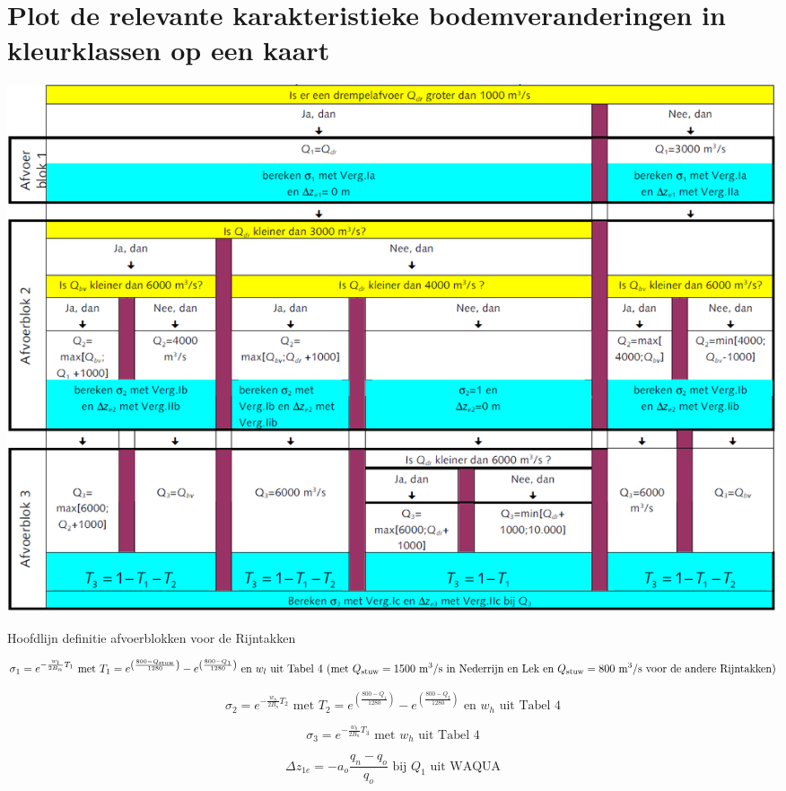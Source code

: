 \begin{enumerate}
\end{enumerate}

\section{Plot de relevante karakteristieke bodemveranderingen in kleurklassen op een kaart}

\begin{table}
\includegraphics[width=\columnwidth]{figures/Tab7.png}
\caption{Hoofdlijn definitie afvoerblokken voor de Rijntakken}
\label{Tab7}
\end{table}

\begin{equation}
\sigma_1 = e^{-\frac{w_l}{2 B_n} T_1} \text{ met } T_1 = e^{\left ( \frac{800-Q_\text{stuw}}{1280} \right )} - e^{\left ( \frac{800-Q_1}{1280} \right )} \text{ en $w_l$ uit Tabel 4 (met $Q_\text{stuw} = 1500$ m\textsuperscript{3}/s in Nederrijn en Lek en $Q_\text{stuw} = 800$ m\textsuperscript{3}/s voor de andere Rijntakken)}
\end{equation}

\begin{equation}
\sigma_2 = e^{-\frac{w_h}{2 B_n} T_2} \text{ met } T_2 = e^{\left ( \frac{800-Q_1}{1280} \right )} - e^{\left ( \frac{800-Q_2}{1280} \right )} \text{ en $w_h$ uit Tabel 4}
\end{equation}

\begin{equation}
\sigma_3 = e^{-\frac{w_h}{2 B_n} T_3} \text{ met $w_h$ uit Tabel 4}
\end{equation}

\begin{equation}
\Delta z_{1e} = -a_o \frac{q_n - q_o}{q_o} \text{ bij $Q_1$ uit WAQUA}
\end{equation}

